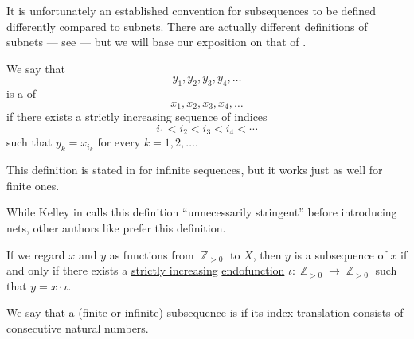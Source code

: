 It is unfortunately an established convention for subsequences to be defined differently compared to subnets. There are actually different definitions of subnets --- see \cite{Lehuta2009Subnets} --- but we will base our exposition on that of .

\begin{definition}\label{def:subsequence}
  We say that
  \begin{equation}\label{eq:def:subsequence/sub}
    y_1, y_2, y_3, y_4, \ldots
  \end{equation}
  is a  of
  \begin{equation}\label{eq:def:subsequence/original}
    x_1, x_2, x_3, x_4, \ldots
  \end{equation}
  if there exists a strictly increasing sequence of indices
  \begin{equation*}
    i_1 < i_2 < i_3 < i_4 < \cdots
  \end{equation*}
  such that \( y_k = x_{i_k} \) for every \( k = 1, 2, \ldots \).
\end{definition}
\begin{comments}
  \item This definition is stated in \cite[63]{Kelley1975Topology} for infinite sequences, but it works just as well for finite ones.

  \item While Kelley in \cite[63]{Kelley1975Topology} calls this definition \enquote{unnecessarily stringent} before introducing nets, other authors like  prefer this definition.

  \item If we regard \( x \) and \( y \) as functions from \( \BbbZ_{>0} \) to \( X \), then \( y \) is a subsequence of \( x \) if and only if there exists a \hyperref[def:order_function/preserving]{strictly increasing} \hyperref[def:function/endofunction]{endofunction} \( \iota: \BbbZ_{>0} \to \BbbZ_{>0} \) such that \( y = x \cdot \iota \).
\end{comments}

\begin{definition}\label{def:contiguous_subsequence}\mimprovised
  We say that a (finite or infinite) \hyperref[def:subsequence]{subsequence} is  if its index translation consists of consecutive natural numbers.
\end{definition}

